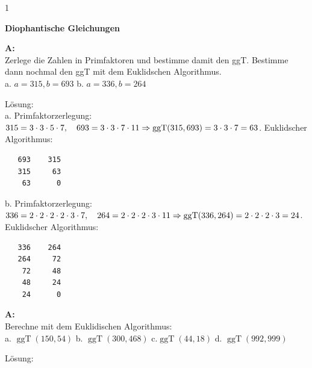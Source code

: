 \documentclass[landscape,twocolumn,a4paper]{article}
\begin{document}
\newcommand{\ggT}{\operatorname{ggT}}
\newcommand{\Mod}[3]{#1\equiv#2\text{ mod }#3}
\newcommand{\tmod}{\text{ mod }}
\newcommand\x{1}
\setcounter {y} {1}

\parindent 0mm

\textbf{Diophantische Gleichungen} 
\bigskip

\textbf{A:}   \\
Zerlege die Zahlen in Primfaktoren und bestimme damit den ggT. Bestimme dann nochmal den ggT mit
dem Euklidschen Algorithmus. \\
a.  $a = 315, b=693$ \quad b. $a=336,b=264$
\bigskip  {}

Lösung: \\
a. Primfaktorzerlegung: $315 = 3 \cdot 3 \cdot 5 \cdot 7, \quad 693 = 3 \cdot 3 \cdot 7 \cdot 11 \\ \Rightarrow \ggT(315,693) = 3 \cdot 3 \cdot 7 = 63$. Euklidscher Algorithmus: 
\begin{lstlisting}
   693    315
   315     63
    63      0
\end{lstlisting}

b. Primfaktorzerlegung: $336 = 2 \cdot 2 \cdot 2 \cdot 2 \cdot 3 \cdot 7, \quad 264 = 2 \cdot 2 \cdot 2 \cdot 3 \cdot 11  \\ \Rightarrow \ggT(336,264) = 2 \cdot 2 \cdot 2 \cdot 3= 24$. Euklidscher Algorithmus: 
\begin{lstlisting}
   336    264
   264     72
    72     48
    48     24
    24      0
\end{lstlisting}

 

\textbf{A:}   \\
Berechne mit dem Euklidischen Algorithmus: \\
a.  $\ggT(150,54)$ \quad b. $\ggT(300,468)$ \quad 
 c.$\ggT(44,18)$ \quad d. $\ggT(992,999)$
\bigskip {}

Lösung: \\
\end{document}
